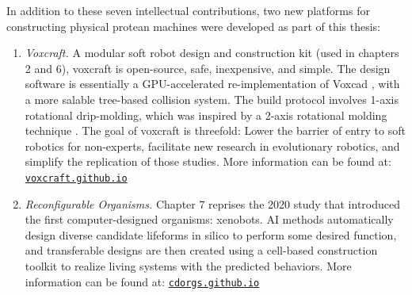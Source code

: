 \begin{enumerate}
    
\end{enumerate}

\vspace{1em}

\noindent
In addition to these seven intellectual contributions, 
two new platforms for constructing physical protean machines were developed as part of this thesis:

\begin{enumerate}
    \item \textit{Voxcraft.} A modular soft robot design and construction kit (used in chapters 2 and 6), 
    voxcraft is open-source, safe, inexpensive, and simple.
    The design software is essentially a
    GPU-accelerated
    re-implementation of Voxcad \cite{hiller2014dynamic}, 
    with a more salable tree-based collision system.
    The build protocol involves 1-axis rotational drip-molding, which
    was inspired by a 2-axis rotational molding technique \cite{zhao_scalable_2015}.
    The goal of voxcraft is threefold:
    Lower the barrier of entry to soft robotics for non-experts,
    facilitate new research in evolutionary robotics,
    and simplify the replication of those studies.
    More information can be found at:
    \href{https://voxcraft.github.io/}{\color{blue}\texttt{voxcraft.github.io}}
    
    
    \item \textit{Reconfigurable Organisms.} Chapter 7 reprises the 2020 study that introduced the first computer-designed organisms: xenobots.
    AI methods automatically design diverse candidate lifeforms in silico to perform some desired function, and transferable designs are then created using a cell-based construction toolkit to realize living systems with the predicted behaviors. 
    More information can be found at: \href{https://cdorgs.github.io/}{\color{blue}\texttt{cdorgs.github.io}}

\end{enumerate}




